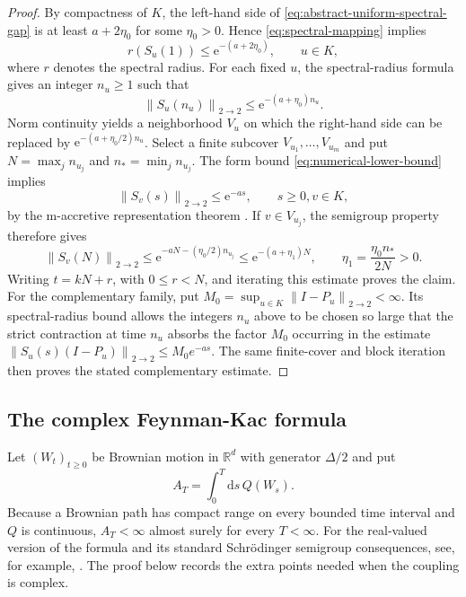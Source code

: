\documentclass[11pt,reqno]{amsart}
\theoremstyle{definition}
\numberwithin{equation}{section}
\newcommand{\<}{\langle}
\renewcommand{\>}{\rangle}
\def\de{{\rm d}}
\def\de{{\mathrm {d}}}
\def\lt{\left}
\def\rt{\right}
\newcommand{\norm}[1]{{\lt\|#1\rt\|}}
\begin{document}
\begin{appendix}
\begin{proof}
By compactness of $K$, the left-hand side of
\eqref{eq:abstract-uniform-spectral-gap} is at least $a+2\eta_0$ for some
$\eta_0>0$.  Hence \eqref{eq:spectral-mapping} implies
\[
 r(S_u(1))\leq \mathrm e^{-(a+2\eta_0)},
 \qquad u\in K,
\]
where $r$ denotes the spectral radius.
For each fixed $u$, the spectral-radius formula gives an integer $n_u\geq1$
such that
\[
 \norm{S_u(n_u)}_{2 \to 2}\leq \mathrm e^{-(a+\eta_0)n_u}.
\]
Norm continuity yields a neighborhood $V_u$ on which the right-hand side can
be replaced by $\mathrm e^{-(a+\eta_0/2)n_u}$.  Select a finite subcover
$V_{u_1},\ldots,V_{u_m}$ and put
$N=\max_j n_{u_j}$ and $n_*=\min_j n_{u_j}$.  The form bound
\eqref{eq:numerical-lower-bound} implies
\begin{equation}
 \norm{S_v(s)}_{2 \to 2}\leq \mathrm e^{-as},
 \qquad s\geq0, v\in K,
 \nonumber
\end{equation}
by the m-accretive representation theorem
\cite[Chapter~VI, Section~2]{Kato}.  If $v\in V_{u_j}$, the semigroup property
therefore gives
\[
 \norm{S_v(N)}_{2 \to 2}
 \leq \mathrm e^{-aN-(\eta_0/2)n_{u_j}}
 \leq \mathrm e^{-(a+\eta_1)N},
 \qquad
 \eta_1=\frac{\eta_0n_*}{2N}>0.
\]
Writing $t=kN+r$, with $0\leq r<N$, and iterating this estimate proves the
claim.  For the complementary family, put
$M_0=\sup_{u\in K}\norm{I-P_u}_{2 \to 2}<\infty$.  Its spectral-radius bound allows
the integers $n_u$ above to be chosen so large that the strict contraction at
time $n_u$ absorbs the factor $M_0$ occurring in the estimate
$\norm{S_u(s)(I-P_u)}_{2 \to 2}\leq M_0e^{-as}$.  The same finite-cover and block
iteration then proves the stated complementary estimate.
\end{proof}





\subsection{The complex Feynman-Kac formula}
\label{subsec:complex-fk-app}

Let $(W_t)_{t\geq0}$ be Brownian motion in $\mathbb R^d$ with generator
$\Delta/2$ and put
\[
       A_T=\int_0^T \de s \, Q(W_s).
\]
Because a Brownian path has compact range on every bounded time interval and
$Q$ is continuous, $A_T<\infty$ almost surely for every $T<\infty$.
For the real-valued version of the formula and its standard Schr\"odinger
semigroup consequences, see, for example, \cite{SimonSemigroups}.
The proof below records the extra points needed when the coupling is complex.


\end{appendix}
\end{document}
